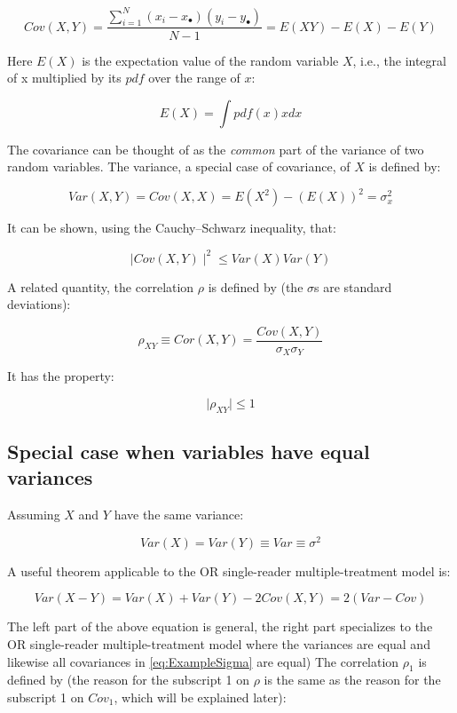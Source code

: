 \documentclass[
]{book}
\begin{document}
\begin{equation}
Cov(X,Y) =\frac{\sum_{i=1}^{N}(x_{i}-x_{\bullet})(y_{i}-y_{\bullet})}{N-1}=E(XY)-E(X)-E(Y)
\label{eq:DefinitionCovariance}
\end{equation}

Here \(E(X)\) is the expectation value of the random variable \(X\), i.e., the integral of x multiplied by its \(pdf\) over the range of \(x\):

\[E(X)=\int pdf(x) x dx\]

The covariance can be thought of as the \emph{common} part of the variance of two random variables. The variance, a special case of covariance, of \(X\) is defined by:

\[Var(X,Y) = Cov(X,X)=E(X^2)-(E(X))^2=\sigma_x^2\]

It can be shown, using the Cauchy--Schwarz inequality, that:

\[\mid Cov(X,Y) \mid^2 \le Var(X)Var(Y)\]

A related quantity, the correlation \(\rho\) is defined by (the \(\sigma\)s are standard deviations):

\[\rho_{XY} \equiv Cor(X,Y)=\frac{Cov(X,Y)}{\sigma_X \sigma_Y}\]

It has the property:

\[\mid \rho_{XY} \mid \le 1\]

\hypertarget{special-case-when-variables-have-equal-variances}{%
\subsection{Special case when variables have equal variances}\label{special-case-when-variables-have-equal-variances}}

Assuming \(X\) and \(Y\) have the same variance:

\[Var(X)=Var(Y)\equiv Var\equiv \sigma^2\]

A useful theorem applicable to the OR single-reader multiple-treatment model is:

\begin{equation}
Var(X-Y)=Var(X)+Var(Y)-2Cov(X,Y)=2(Var-Cov)
\label{eq:UsefulTheorem}
\end{equation}

The left part of the above equation is general, the right part specializes to the OR single-reader multiple-treatment model where the variances are equal and likewise all covariances in \eqref{eq:ExampleSigma} are equal) The correlation \(\rho_1\) is defined by (the reason for the subscript 1 on \(\rho\) is the same as the reason for the subscript 1 on \(Cov_1\), which will be explained later):
\end{document}
